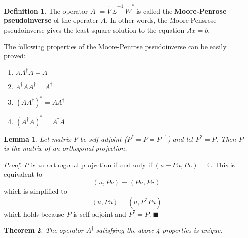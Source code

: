 \documentclass[a4paper,10pt]{book}
\theoremstyle{plain}
\newtheorem{theorem}{Theorem}[section]
\theoremstyle{plain}
\newtheorem{lemma}[theorem]{Lemma}
\newenvironment{lproof}{\textsl{Proof.}}{\hfill$\blacksquare$}
\theoremstyle{definition}
\newtheorem{definition}{Definition}[section]
\begin{document}
\begin{definition}
The operator $A^{\dagger} = \widetilde{V} \, \widetilde{\Sigma}^{-1} \, \widetilde{W}^{*} $ is called the \textbf{Moore-Penrose pseudoinverse} of the operator $A$. In other words, the Moore-Pensrose pseudoinverse gives the least square solution to the equation $Ax = b$. 

The following properties of the Moore-Penrose pseudoinverse can be easily proved: 
\begin{enumerate}
	\item $AA^{\dagger}A = A$
	\item $A^{\dagger} A A^{\dagger} = A^{\dagger}$
	\item $(AA^{\dagger})^{*} = AA^{\dagger}$
	\item $(A^{\dagger} A)^{*} = A^{\dagger} A$
\end{enumerate}
\end{definition}

\begin{lemma}
Let matrix $P$ be self-adjoint ($P^{*} = P = P^{-1}$) and let $P^{2} = P$. Then $P$ is the matrix of an orthogonal projection.
\end{lemma}

\begin{lproof}
$P$ is an orthogonal projection if and only if $(u - Pu, Pu) = 0$. This is equivalent to 
$$(u, Pu) = (Pu, Pu)$$
which is simplified to 
$$(u, Pu) = (u, P^{*}Pu)$$
which holds because $P$ is self-adjoint and $P^{2} = P$. 
\end{lproof}

\begin{theorem}
The operator $A^{\dagger}$ satisfying the above 4 properties is unique. 
\end{theorem}
\end{document}
